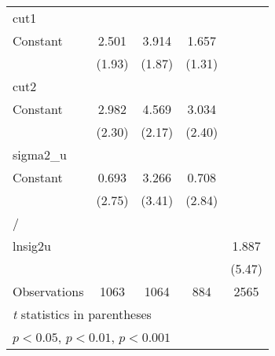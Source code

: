 {\begin{tabular}{l*{4}{c}}
\hline
cut1                &                     &                     &                     &                     \\
Constant            &       2.501         &       3.914         &       1.657         &                     \\
                    &      (1.93)         &      (1.87)         &      (1.31)         &                     \\
\hline
cut2                &                     &                     &                     &                     \\
Constant            &       2.982\sym{*}  &       4.569\sym{*}  &       3.034\sym{*}  &                     \\
                    &      (2.30)         &      (2.17)         &      (2.40)         &                     \\
\hline
sigma2\_u            &                     &                     &                     &                     \\
Constant            &       0.693\sym{**} &       3.266\sym{***}&       0.708\sym{**} &                     \\
                    &      (2.75)         &      (3.41)         &      (2.84)         &                     \\
\hline
/                   &                     &                     &                     &                     \\
lnsig2u             &                     &                     &                     &       1.887\sym{***}\\
                    &                     &                     &                     &      (5.47)         \\
\hline
Observations        &        1063         &        1064         &         884         &        2565         \\
\hline\hline
\multicolumn{5}{l}{\footnotesize \textit{t} statistics in parentheses}\\
\multicolumn{5}{l}{\footnotesize \sym{*} \(p<0.05\), \sym{**} \(p<0.01\), \sym{***} \(p<0.001\)}\\
\end{tabular}
}
